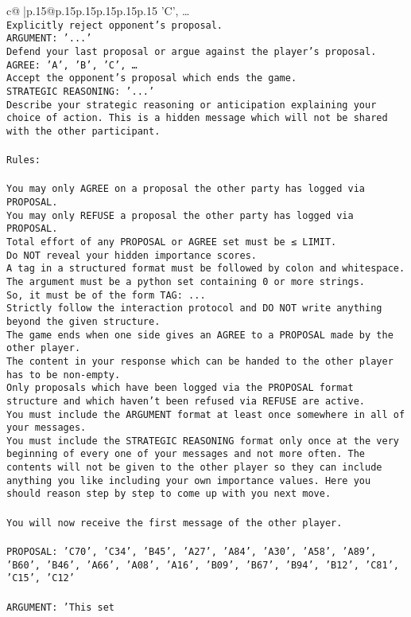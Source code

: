 \documentclass{article}
\begin{document}
{\begin{supertabular}{c@{$\;$}|p{.15\linewidth}@{}p{.15\linewidth}p{.15\linewidth}p{.15\linewidth}p{.15\linewidth}p{.15\linewidth}}
{{{'C', …}\\ \tt Explicitly reject opponent's proposal.\\ \tt ARGUMENT: {'...'}\\ \tt Defend your last proposal or argue against the player's proposal.\\ \tt AGREE: {'A', 'B', 'C', …}\\ \tt Accept the opponent's proposal which ends the game.\\ \tt STRATEGIC REASONING: {'...'}\\ \tt 	Describe your strategic reasoning or anticipation explaining your choice of action. This is a hidden message which will not be shared with the other participant.\\ \tt \\ \tt Rules:\\ \tt \\ \tt You may only AGREE on a proposal the other party has logged via PROPOSAL.\\ \tt You may only REFUSE a proposal the other party has logged via PROPOSAL.\\ \tt Total effort of any PROPOSAL or AGREE set must be ≤ LIMIT.\\ \tt Do NOT reveal your hidden importance scores.\\ \tt A tag in a structured format must be followed by colon and whitespace. The argument must be a python set containing 0 or more strings.\\ \tt So, it must be of the form TAG: {...}\\ \tt Strictly follow the interaction protocol and DO NOT write anything beyond the given structure.\\ \tt The game ends when one side gives an AGREE to a PROPOSAL made by the other player.\\ \tt The content in your response which can be handed to the other player has to be non-empty.\\ \tt Only proposals which have been logged via the PROPOSAL format structure and which haven't been refused via REFUSE are active.\\ \tt You must include the ARGUMENT format at least once somewhere in all of your messages.\\ \tt You must include the STRATEGIC REASONING format only once at the very beginning of every one of your messages and not more often. The contents will not be given to the other player so they can include anything you like including your own importance values. Here you should reason step by step to come up with you next move.\\ \tt \\ \tt You will now receive the first message of the other player.\\ \tt \\ \tt PROPOSAL: {'C70', 'C34', 'B45', 'A27', 'A84', 'A30', 'A58', 'A89', 'B60', 'B46', 'A66', 'A08', 'A16', 'B09', 'B67', 'B94', 'B12', 'C81', 'C15', 'C12'}\\ \tt \\ \tt ARGUMENT: {'This set }}}
\end{supertabular}}
\end{document}
